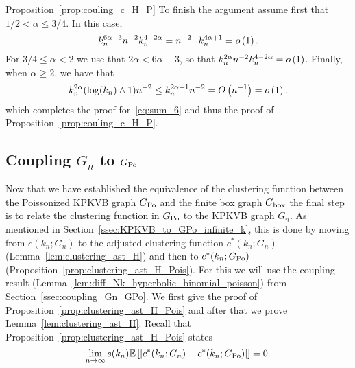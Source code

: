 \begin{proofof}{Proposition~\ref{prop:couling_c_H_P}}
To finish the argument assume first that $1/2 <\alpha \leq 3/4$. In this case,
\[
	k_n^{6\alpha -3}  n^{-2} k_n^{4 - 2\alpha} = 
	n^{-2} \cdot k_n^{4\alpha +1} = o\left(1\right).
\]
For $3/4 \le \alpha < 2$ we use that $2\alpha < 6\alpha - 3$, so that $k_n^{2\alpha} n^{-2} k_n^{4 - 2\alpha} = o\left(1\right)$. Finally, when $\alpha \geq 2$, we have that
\[
	k_n^{2\alpha} (\log(k_n) \wedge 1) n^{-2} \le k_n^{2\alpha + 1} n^{-2} = O\left(n^{-1}\right) = o\left(1\right).
\] 
which completes the proof for~\eqref{eq:sum_6} and thus the proof of Proposition~\ref{prop:couling_c_H_P}.
\end{proofof}

\subsection{Coupling \texorpdfstring{$G_n$}{Gn} to \texorpdfstring{$G_{{\mathrm{Po}}}$}{G Po}}\label{ssec:coupling_H_HP}

Now that we have established the equivalence of the clustering function between the Poissonized KPKVB graph $G_{{\mathrm{Po}}}$ and the finite box graph $G_{\mathrm{box}}$ the final step is to relate the clustering function in $G_{{\mathrm{Po}}}$ to the KPKVB graph $G_n$. As mentioned in Section~\ref{ssec:KPKVB_to_GPo_infinite_k}, this is done by moving from $c(k_n; G_n)$ to the adjusted clustering function $c^\ast(k_n; G_n)$ (Lemma~\ref{lem:clustering_ast_H}) and then to $c^\ast(k_n; G_{{\mathrm{Po}}})$ (Proposition~\ref{prop:clustering_ast_H_Pois}). For this we will use the coupling result (Lemma~\ref{lem:diff_Nk_hyperbolic_binomial_poisson}) from Section~\ref{ssec:coupling_Gn_GPo}. We first give the proof of Proposition~\ref{prop:clustering_ast_H_Pois} and after that we prove Lemma~\ref{lem:clustering_ast_H}. Recall that Proposition~\ref{prop:clustering_ast_H_Pois} states
\[
	\lim_{n \to \infty} s(k_n)\mathbb{E}\left[\left|c^\ast(k_n; G_n) - c^\ast(k_n; G_{{\mathrm{Po}}})\right|\right] = 0.
\]

